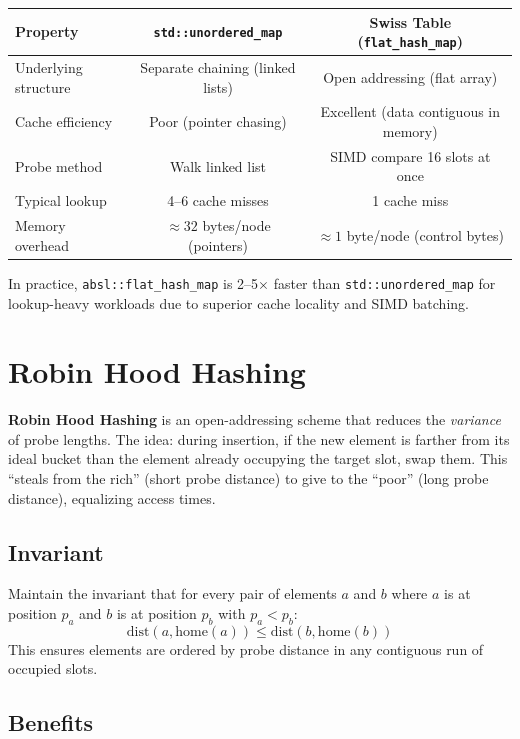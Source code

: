 \begin{center}
\begin{tabular}{lcc}
\toprule
Property & \texttt{std::unordered\_map} & Swiss Table (\texttt{flat\_hash\_map}) \\
\midrule
Underlying structure & Separate chaining (linked lists) & Open addressing (flat array) \\
Cache efficiency & Poor (pointer chasing) & Excellent (data contiguous in memory) \\
Probe method & Walk linked list & SIMD compare 16 slots at once \\
Typical lookup & 4--6 cache misses & 1 cache miss \\
Memory overhead & $\approx 32$ bytes/node (pointers) & $\approx 1$ byte/node (control bytes) \\
\bottomrule
\end{tabular}
\end{center}

In practice, \texttt{absl::flat\_hash\_map} is 2--5$\times$ faster than \texttt{std::unordered\_map} for lookup-heavy workloads due to superior cache locality and SIMD batching.

\section{Robin Hood Hashing}

\textbf{Robin Hood Hashing} is an open-addressing scheme that reduces the \emph{variance} of probe lengths. The idea: during insertion, if the new element is farther from its ideal bucket than the element already occupying the target slot, swap them. This ``steals from the rich'' (short probe distance) to give to the ``poor'' (long probe distance), equalizing access times.

\subsection{Invariant}

Maintain the invariant that for every pair of elements $a$ and $b$ where $a$ is at position $p_{a}$ and $b$ is at position $p_{b}$ with $p_{a} < p_{b}$:
\[
\text{dist}(a, \text{home}(a)) \leq \text{dist}(b, \text{home}(b))
\]
This ensures elements are ordered by probe distance in any contiguous run of occupied slots.

\subsection{Benefits}


